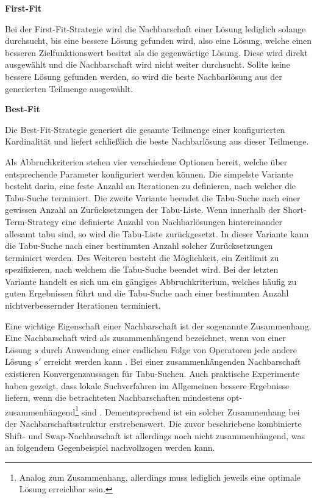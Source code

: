 \textbf{First-Fit}

Bei der First-Fit-Strategie wird die Nachbarschaft einer Lösung lediglich solange durchsucht, bis eine bessere
Lösung gefunden wird, also eine Lösung, welche einen besseren Zielfunktionswert besitzt als die gegenwärtige Lösung.
Diese wird direkt ausgewählt und die Nachbarschaft wird nicht weiter durchsucht. Sollte keine bessere Lösung gefunden werden, so wird die beste Nachbarlösung aus der generierten Teilmenge ausgewählt.\newline

\textbf{Best-Fit}

Die Best-Fit-Strategie generiert die gesamte Teilmenge einer konfigurierten Kardinalität und liefert schließlich die
beste Nachbarlösung aus dieser Teilmenge.\newline

Als Abbruchkriterien stehen vier verschiedene Optionen bereit, welche über entsprechende Parameter konfiguriert werden können. Die simpelste Variante besteht darin, eine feste Anzahl an Iterationen zu definieren, nach welcher die Tabu-Suche terminiert. Die zweite Variante beendet die Tabu-Suche nach einer gewissen Anzahl an Zurücksetzungen der Tabu-Liste. Wenn innerhalb der Short-Term-Strategy eine definierte Anzahl von Nachbarlösungen hintereinander allesamt tabu sind, so wird die Tabu-Liste zurückgesetzt. In dieser Variante kann die Tabu-Suche nach einer bestimmten Anzahl solcher Zurücksetzungen terminiert werden. Des Weiteren besteht die Möglichkeit, ein Zeitlimit
zu spezifizieren, nach welchem die Tabu-Suche beendet wird. Bei der letzten Variante handelt es sich um ein gängiges Abbruchkriterium, welches häufig zu guten Ergebnissen führt und die Tabu-Suche nach einer bestimmten Anzahl nichtverbessernder Iterationen terminiert.

Eine wichtige Eigenschaft einer Nachbarschaft ist der sogenannte Zusammenhang. Eine Nachbarschaft wird als zusammenhängend bezeichnet, wenn von einer Lösung $s$ durch Anwendung einer endlichen Folge von Operatoren jede andere Lösung $s'$ erreicht
werden kann \cite{Brucker2006}. Bei einer zusammenhängenden Nachbarschaft existieren Konvergenzaussagen für Tabu-Suchen.
Auch praktische Experimente haben gezeigt, dass lokale Suchverfahren im Allgemeinen bessere Ergebnisse
liefern, wenn die betrachteten Nachbarschaften mindestens opt-zusammenhängend\footnote{Analog zum Zusammenhang, allerdings muss lediglich jeweils eine optimale Lösung erreichbar sein.} sind \cite{Knust2017}.
Dementsprechend ist ein solcher Zusammenhang bei der Nachbarschaftsstruktur erstrebenswert.
Die zuvor beschriebene kombinierte Shift- und Swap-Nachbarschaft ist allerdings noch nicht zusammenhängend,
was an folgendem Gegenbeispiel nachvollzogen werden kann.

